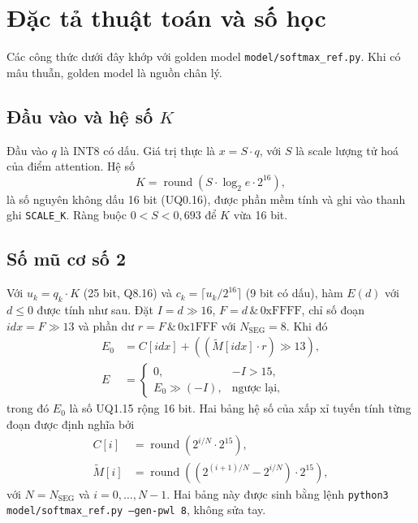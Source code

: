 \section{Đặc tả thuật toán và số học}

Các công thức dưới đây khớp với golden model \texttt{model/softmax\_ref.py}. Khi có mâu thuẫn, golden model là nguồn chân lý.

\subsection{Đầu vào và hệ số $K$}

Đầu vào $q$ là INT8 có dấu. Giá trị thực là $x = S \cdot q$, với $S$ là scale lượng tử hoá của điểm attention. Hệ số
\begin{equation}
  K = \operatorname{round}(S \cdot \log_2 e \cdot 2^{16}),
\end{equation}
là số nguyên không dấu 16 bit (UQ0.16), được phần mềm tính và ghi vào thanh ghi \texttt{SCALE\_K}. Ràng buộc $0 < S < 0{,}693$ để $K$ vừa 16 bit.

\subsection{Số mũ cơ số 2}

Với $u_k = q_k \cdot K$ (25 bit, Q8.16) và $c_k = \lceil u_k / 2^{16} \rceil$ (9 bit có dấu), hàm $E(d)$ với $d \le 0$ được tính như sau. Đặt $I = d \gg 16$, $F = d \,\&\, \text{0xFFFF}$, chỉ số đoạn $\mathit{idx} = F \gg 13$ và phần dư $r = F \,\&\, \text{0x1FFF}$ với $N_{\text{SEG}} = 8$. Khi đó
\begin{align}
  E_0 &= C[\mathit{idx}] + \left((\tilde{M}[\mathit{idx}] \cdot r) \gg 13\right), \\
  E   &= \begin{cases} 0, & -I > 15, \\ E_0 \gg (-I), & \text{ngược lại,} \end{cases}
\end{align}
trong đó $E_0$ là số UQ1.15 rộng 16 bit. Hai bảng hệ số của xấp xỉ tuyến tính từng đoạn được định nghĩa bởi
\begin{align}
  C[i] &= \operatorname{round}\left(2^{i/N} \cdot 2^{15}\right), \\
  \tilde{M}[i] &= \operatorname{round}\left(\left(2^{(i+1)/N} - 2^{i/N}\right) \cdot 2^{15}\right),
\end{align}
với $N = N_{\text{SEG}}$ và $i = 0, \dots, N-1$. Hai bảng này được sinh bằng lệnh \texttt{python3 model/softmax\_ref.py --gen-pwl 8}, không sửa tay.


